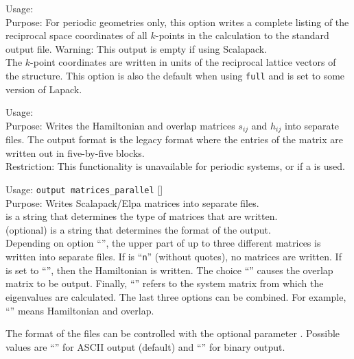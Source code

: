 {
  \noindent
  Usage:   \\[1.0ex]
  Purpose: For periodic geometries only, this option writes a complete
  listing of the reciprocal space coordinates of all $k$-points in the
  calculation to the standard output file. Warning: This output is empty if using Scalapack. \\
}
The $k$-point coordinates are written in units of the reciprocal
lattice vectors of the structure. This option is also the default when
using  \texttt{full} and  is set to some version of Lapack.

{
  \noindent
  Usage:   \\[1.0ex]
  Purpose: Writes the Hamiltonian and overlap matrices $s_{ij}$ and
  $h_{ij}$ into separate files. The output format is the legacy format
  where the entries of the matrix are written out in five-by-five
  blocks. \\[1.0ex]
  Restriction: This functionality is unavailable for periodic systems,
    or if a  is used. \\[1.0ex]
}

{
  \noindent
  Usage: \texttt{output matrices\_parallel}  []
  \\[1.0ex]
  Purpose: Writes Scalapack/Elpa matrices into separate files.  \\[1.0ex]
   is a string that determines the type of matrices that are
  written.  \\[1.0ex]
   (optional) is a string that determines the format of the
  output.  \\
}
Depending on option ``'', the upper part of up to three different
matrices is written into separate files. If  is ``\texttt{n}''
(without quotes), no matrices are written. If  is set to
``'', then the Hamiltonian is written. The choice ``''
causes the overlap matrix to be output. Finally, ``'' refers to the
system matrix from which the eigenvalues are calculated. The last three options
can be combined. For example, ``'' means Hamiltonian and overlap.

The format of the files can be controlled with the optional parameter
. Possible values are ``'' for ASCII output (default)
and ``'' for binary output.


